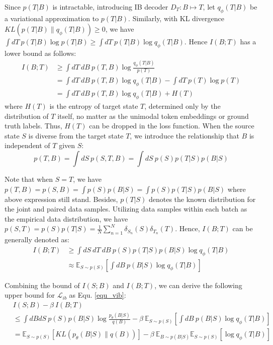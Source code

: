 \documentclass{article}
\begin{document}
Since $p(T|B)$ is intractable, introducing IB decoder $D_T:B\mapsto T$, let $q_\phi(T|B)$ be a variational approximation to $p(T|B)$. Similarly, with KL divergence $KL(p(T|B)\parallel q_\phi(T|B))\geq 0$, we have $\int dT\ p(T|B) \log{p(T|B)} \geq \int dT\ p(T|B) \log{q_\phi(T|B)}$. Hence $I(B;T)$ has a lower bound as follows:
\begin{equation}
\begin{aligned}
    I(B;T) &\geq \int dT\ dB\ p(T, B) \log{\frac{q_\phi(T|B)}{p(T)}} \\
    &=\int dT\ dB\ p(T, B) \log{q_\phi(T|B)}-\int dT\ p(T) \log{p(T)} \\
    &=\int dT\ dB\ p(T, B) \log{q_\phi(T|B)}+H(T)
\end{aligned}
\end{equation}
where $H(T)$ is the entropy of target state $T$, determined only by the distribution of $T$ itself, no matter as the unimodal token embeddings or ground truth labels. Thus, $H(T)$ can be dropped in the loss function. When the source state $S$ is diverse from the target state $T$, we introduce the relationship that $B$ is independent of $T$ given $S$:
\begin{equation}
    p(T,B)=\int dS\ p(S,T,B) = \int dS\ p(S) p(T|S) p(B|S) 
\end{equation}

Note that when $S=T$, we have $p(T,B)=p(S,B)=\int p(S)p(B|S)=\int p(S)p(T|S)p(B|S)$ where above expression still stand. Besides, $p(T|S)$ denotes the known distribution for the joint and paired data samples. Utilizing data samples within each batch as the empirical data distribution, we have $p(S,T)=p(S)p(T|S)=\frac{1}{N}\sum_{n=1}^N\delta_{S_n}(S)\delta_{T_n}(T)$. Hence, $I(B;T)$ can be generally denoted as:
\begin{equation}
\begin{aligned}
    I(B;T) &\geq \int dS\ dT\ dB\ p(S) p(T|S) p(B|S) \log{q_\phi(T|B)} \\
    &\approx \mathbb{E}_{S\sim p(S)}\left[\int dB\ p(B|S) \log{q_\phi(T|B)}\right]
\end{aligned}
\end{equation}


Combining the bound of $I(S;B)$ and $I(B;T)$, we can derive the following upper bound for $\mathcal{L}_{ib}$ as Equ. \ref{equ_vib}:
\begin{equation}
\begin{aligned}
    & I(S;B) - \beta\ I(B;T) \\
    &\leq \int dBdS\ p(S)p(B|S) \log{\frac{p_\theta(B|S)}{q(B)}} - \beta\ \mathbb{E}_{S\sim p(S)}\left[\int dB\ p(B|S) \log{q_\phi(T|B)} \right]\\
    &= \mathbb{E}_{S\sim p(S)} \left[KL( p_\theta(B|S)\parallel q(B))\right] - \beta\ \mathbb{E}_{B\sim p(B|S)}\mathbb{E}_{S\sim p(S)} [\log q_\phi(T|B)]
\end{aligned}
\end{equation}
\end{document}
